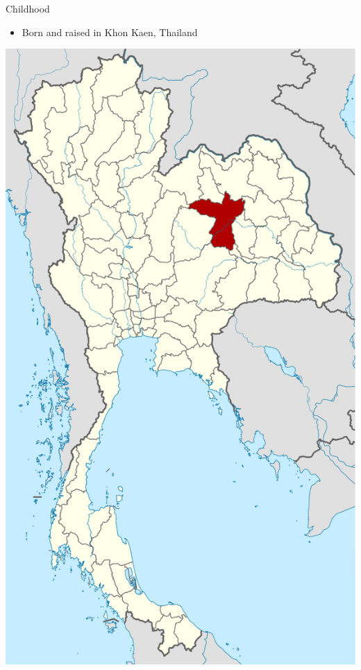 \documentclass[10pt, svgnames]{beamer}
\begin{document}
\begin{frame}[label={sec:orge514d6b}]{Childhood}
\begin{itemize}
\item Born and raised in Khon Kaen, Thailand
\end{itemize}

\begin{center}
\includegraphics[height=0.8\textheight]{pictures/khonkaen.png}
\end{center}
\end{frame}
\end{document}
